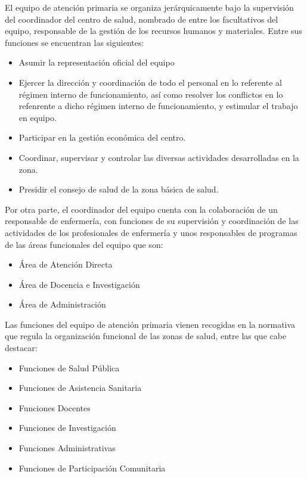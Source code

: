 El equipo de atención primaria se organiza jerárquicamente bajo la supervisión del coordinador del centro de salud, nombrado de entre los facultativos del equipo, responsable de la gestión de los recursos humanos y materiales. Entre sus funciones se encuentran las siguientes:

\begin{itemize}
    \item Asumir la representación oficial del equipo
    \item Ejercer la dirección y coordinación de todo el personal en lo referente al régimen interno de funcionamiento, así como resolver los conflictos en lo refenrente a dicho régimen interno de funcionamiento, y estimular el trabajo en equipo.
    \item Participar en la gestión económica del centro.
    \item Coordinar, supervisar y controlar las diversas actividades desarrolladas en la zona.
    \item Presidir el consejo de salud de la zona básica de salud.
\end{itemize}

Por otra parte, el coordinador del equipo cuenta con la colaboración de un responsable de enfermería, con funciones de su supervisión y coordinación de las actividades de los profesionales de enfermería y unos responsables de programas de las áreas funcionales del equipo que son:

\begin{itemize}
    \item Área de Atención Directa
    \item Área de Docencia e Investigación
    \item Área de Administración
\end{itemize}

Las funciones del equipo de atención primaria vienen recogidas en la normativa que regula la organización funcional de las zonas de salud, entre las que cabe destacar:

\begin{itemize}
    \item Funciones de Salud Pública
    \item Funciones de Asistencia Sanitaria
    \item Funciones Docentes
    \item Funciones de Investigación
    \item Funciones Administrativas
    \item Funciones de Participación Comunitaria
\end{itemize}

